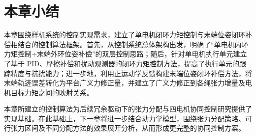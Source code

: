 \section{本章小结}

本章围绕样机系统的控制实现需求，建立了单电机闭环力矩控制与末端位姿闭环补偿相结合的控制算法框架。首先，从控制系统总体架构出发，明确了“单电机内环力矩控制+末端外环位姿补偿”的双层控制思路；随后，针对单电机执行单元建立了基于 PID、摩擦补偿和扰动观测器的闭环力矩控制方法，提高了执行单元的跟踪精度与抗扰能力；进一步地，利用正运动学反馈构建末端位姿闭环补偿方法，将末端轨迹误差转化为平台广义力修正量，并建立了广义力修正到各绳张力增量及电机目标力矩之间的映射关系。

本章所建立的控制算法为后续冗余驱动下的张力分配与四电机协同控制研究提供了实现基础。在此基础上，下一章将进一步结合动力学模型，围绕张力分配策略、可行张力区间及不同分配方法的效果展开分析，从而形成更完整的协同控制方案。




